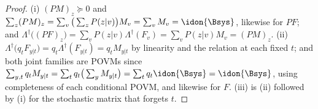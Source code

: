 \begin{proof}
(i) $(PM)_z\succeq0$ and $\sum_z(PM)_z=\sum_v\big(\sum_zP(z|v)\big)M_v
=\sum_vM_v=\idon{\Bsys}$, likewise for $PF$; and
$\Lambda^{\dagger}\big((PF)_z\big)=\sum_vP(z|v)\Lambda^{\dagger}(F_v)
=\sum_vP(z|v)M_v=(PM)_z$.
(ii) $\Lambda^{\dagger}\big(q_tF_{y|t}\big)=q_t\Lambda^{\dagger}(F_{y|t})
=q_tM_{y|t}$ by linearity and the relation at each fixed $t$; and both joint
families are POVMs since
$\sum_{y,t}q_tM_{y|t}=\sum_tq_t\big(\sum_yM_{y|t}\big)
=\sum_tq_t\idon{\Bsys}=\idon{\Bsys}$, using completeness of each conditional
POVM, and likewise for $F$.
(iii) is (ii) followed by (i) for the stochastic matrix that forgets $t$.
\end{proof}
